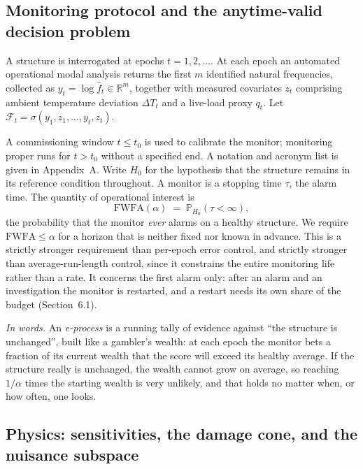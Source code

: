 \documentclass[12pt,a4paper]{article}
\newcommand{\rev}[1]{#1}
\newenvironment{revblock}{}{}
\newcommand{\rev}[1]{{\color{revcol}#1}}
\newenvironment{revblock}{\begingroup\color{revcol}}{\endgroup}
\newcommand{\R}{\mathbb{R}}
\newcommand{\Prob}{\mathbb{P}}
\newcommand{\F}{\mathcal{F}}
\begin{document}
\subsection{Monitoring protocol and the anytime-valid decision problem}

A structure is interrogated at epochs $t=1,2,\dots$. At each epoch an automated operational modal analysis returns the first $m$ identified natural frequencies, collected as $y_t=\log \hat f_t\in\R^m$, together with measured covariates $z_t$ comprising ambient temperature deviation $\Delta T_t$ and a live-load proxy $q_t$. Let $\F_t=\sigma(y_1,z_1,\dots,y_t,z_t)$.

A commissioning window $t\le t_0$ is used to calibrate the monitor; monitoring proper runs for $t>t_0$ without a specified end. \rev{A notation and acronym list is given in Appendix~A.} Write $H_0$ for the hypothesis that the structure remains in its reference condition throughout. A monitor is a stopping time $\tau$, the alarm time. The quantity of operational interest is
\begin{equation}
\mathrm{FWFA}(\alpha) \;=\; \Prob_{H_0}\!\left(\tau<\infty\right),
\label{eq:fwfa}
\end{equation}
the probability that the monitor \emph{ever} alarms on a healthy structure. We require $\mathrm{FWFA}\le\alpha$ for a horizon that is neither fixed nor known in advance. This is a strictly stronger requirement than per-epoch error control, and strictly stronger than average-run-length control, since it constrains the entire monitoring life rather than a rate. \rev{It concerns the first alarm only: after an alarm and an investigation the monitor is restarted, and a restart needs its own share of the budget (Section~6.1).}

\begin{revblock}
\noindent\emph{In words.} An \emph{e-process} is a running tally of evidence against ``the structure is unchanged'', built like a gambler's wealth: at each epoch the monitor bets a fraction of its current wealth that the score will exceed its healthy average. If the structure really is unchanged, the wealth cannot grow on average, so reaching $1/\alpha$ times the starting wealth is very unlikely, and that holds no matter when, or how often, one looks.
\end{revblock}

\subsection{Physics: sensitivities, the damage cone, and the nuisance subspace}\label{sec:physics}
\end{document}
